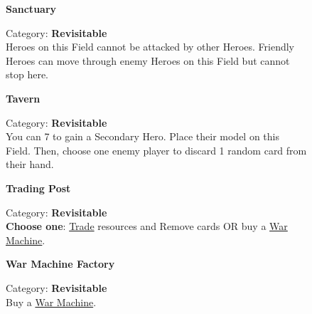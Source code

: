 \begin{figure}[H]
  \begin{minipage}[t]{0.47\textwidth}
    \vspace{0pt}
    \centering
    \textbf{Sanctuary}\par
    \caption{\small Category: \textbf{Revisitable}\\
      Heroes on this Field cannot be attacked by other Heroes.
      Friendly Heroes can move through enemy Heroes on this Field but cannot stop here.}
  \end{minipage}\hfill
  \begin{minipage}[t]{0.47\textwidth}
    \vspace{0pt}
    \centering
    \phantom{j}\textbf{Tavern}\par
    \caption{\small Category: \textbf{Revisitable}\\
      You can 
      7 
      to gain a Secondary Hero.
      Place their model on this Field.
      Then, choose one enemy player to discard 1 random card from their hand.}
  \end{minipage}
\end{figure}

\begin{figure}[H]
  \begin{minipage}[t]{0.47\textwidth}
    \vspace{0pt}
    \centering
    \hypertarget{Trading Post}{\textbf{Trading Post}}\par
    \caption{\small Category: \textbf{Revisitable}\\
      \textbf{Choose one}: \protect\hyperlink{Trading}{Trade} resources and Remove cards OR buy a \protect\hyperlink{War Machines}{War Machine}.
    }
  \end{minipage}\hfill
  \begin{minipage}[t]{0.47\textwidth}
    \vspace{0pt}
    \centering
    \phantom{j}\hypertarget{War Machine Factory}{\textbf{War Machine Factory}}\par
    \caption{\small Category: \textbf{Revisitable}\\Buy a \protect\hyperlink{War Machines}{War Machine}.\phantom{.......}}
  \end{minipage}
\end{figure}

